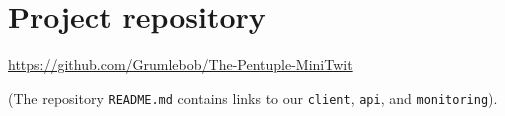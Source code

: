 \section{Project repository}
\label{appn:A}
\href{https://github.com/Grumlebob/The-Pentuple-MiniTwit}{https://github.com/Grumlebob/The-Pentuple-MiniTwit}

(The repository \texttt{README.md} contains links to our \texttt{client}, \texttt{api}, and \texttt{monitoring}).